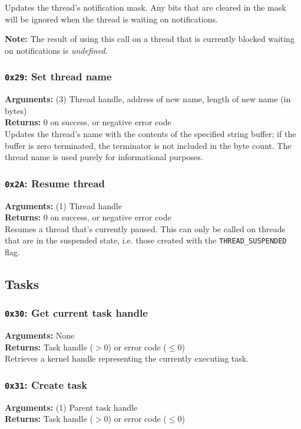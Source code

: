 \documentclass[11pt]{article}
\begin{document}
Updates the thread's notification mask. Any bits that are cleared in the mask will be ignored when the thread is waiting on notifications.

\textbf{Note:} The result of using this call on a thread that is currently blocked waiting on notifications is \textit{undefined.}

\subsubsection{{\tt 0x29}: Set thread name}
\textbf{Arguments:} (3) Thread handle, address of new name, length of new name (in bytes) \\
\textbf{Returns:} 0 on success, or negative error code \\

Updates the thread's name with the contents of the specified string buffer; if the buffer is zero terminated, the terminator is not included in the byte count. The thread name is used purely for informational purposes. 

\subsubsection{{\tt 0x2A}: Resume thread}
\textbf{Arguments:} (1) Thread handle \\
\textbf{Returns:} 0 on success, or negative error code \\

Resumes a thread that's currently paused. This can only be called on threads that are in the suspended state, i.e. those created with the \texttt{THREAD\_SUSPENDED} flag.

\newpage
\subsection{Tasks}
\subsubsection{{\tt 0x30}: Get current task handle}
\textbf{Arguments:} None \\
\textbf{Returns:} Task handle ($>0$) or error code ($\leq0$) \\

Retrieves a kernel handle representing the currently executing task.

\subsubsection{{\tt 0x31}: Create task}
\textbf{Arguments:} (1) Parent task handle \\
\textbf{Returns:} Task handle ($>0$) or error code ($\leq0$) \\
\end{document}
